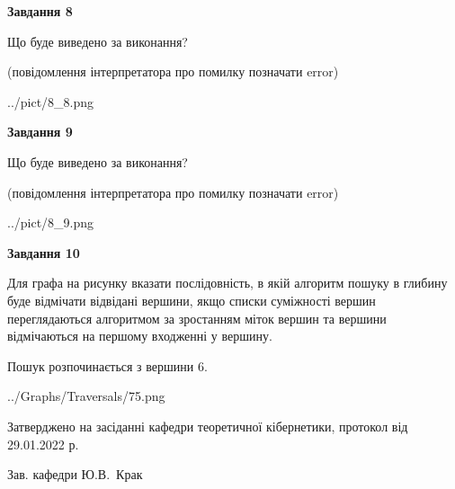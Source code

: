 \documentclass[12pt, ukrainian]{article}
\begin{document}
{\begin {large}
{\begin {center}\textbf{Завдання 8}\end {center}}\par
Що буде виведено за виконання?\par
 (повідомлення інтерпретатора про помилку позначати error)
\begin{center}
	{../pict/8_8.png}
\end{center}
\newpage

{\begin {center}\textbf{Завдання 9}\end {center}}\par
Що буде виведено за виконання?\par
 (повідомлення інтерпретатора про помилку позначати error)\par
\begin{center}
	{../pict/8_9.png}
\end{center}
\newpage

{\begin {center}\textbf{Завдання 10}\end {center}}\par
Для графа на рисунку вказати послідовність, в якій алгоритм пошуку в глибину буде відмічати відвідані вершини, якщо списки суміжності вершин переглядаються алгоритмом за зростанням міток вершин та вершини відмічаються на першому вход\-женні у вершину.\par
Пошук розпочинається з вершини 6.\par

\begin{center}
	{../Graphs/Traversals/75.png}
\end{center}\par
\newpage


\end {large}
}
{\smallskip \begin {small} Затверджено на засіданні кафедри теоретичної кібернетики, протокол  від   29.01.2022 р.\par\smallskip\smallskip
{\parbox {6.5 cm}{Зав. кафедри \dotfill Ю.В.~Крак}} \end{small}}
\end{document}
